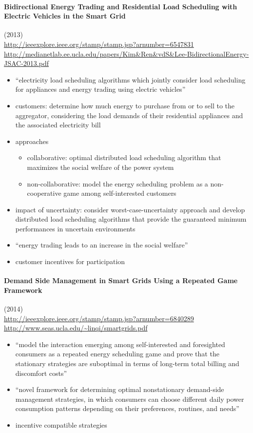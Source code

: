 \documentclass{article}
\begin{document}
\paragraph{Bidirectional Energy Trading and Residential Load Scheduling with Electric Vehicles in the Smart Grid} (2013)
\cite{kim2013bidirectional} \\
\url{http://ieeexplore.ieee.org/stamp/stamp.jsp?arnumber=6547831} \\
\url{http://medianetlab.ee.ucla.edu/papers/Kim&Ren&vdS&Lee-BidirectionalEnergy-JSAC-2013.pdf}
\begin{itemize}
\item ``electricity load scheduling algorithms which jointly consider load scheduling for appliances and energy trading using electric vehicles''
\item customers: determine how much energy to purchase from or to sell to the aggregator, considering the load demands of their residential appliances and the associated electricity bill
\item approaches
\begin{itemize}
\item collaborative: optimal distributed load scheduling algorithm that maximizes the social welfare of the power system
\item non-collaborative: model the energy scheduling problem as a non-cooperative game among self-interested customers
\end{itemize}
\item impact of uncertainty: consider worst-case-uncertainty approach and develop distributed load scheduling algorithms that provide the guaranteed minimum performances in uncertain environments
\item ``energy trading leads to an increase in the social welfare''
\item customer incentives for participation
\end{itemize}

\paragraph{Demand Side Management in Smart Grids Using a Repeated Game Framework} (2014)
\cite{song2014demand} \\
\url{http://ieeexplore.ieee.org/stamp/stamp.jsp?arnumber=6840289}
\url{http://www.seas.ucla.edu/~linqi/smartgrids.pdf}
\begin{itemize}
\item ``model the interaction emerging among self-interested and foresighted consumers as a repeated energy scheduling game and prove that the stationary strategies are suboptimal in terms of long-term total billing and discomfort costs''
\item ``novel framework for determining optimal nonstationary demand-side management strategies, in which consumers can choose different daily power consumption patterns depending on their preferences, routines, and needs''
\item incentive compatible strategies
\end{itemize}
\end{document}

